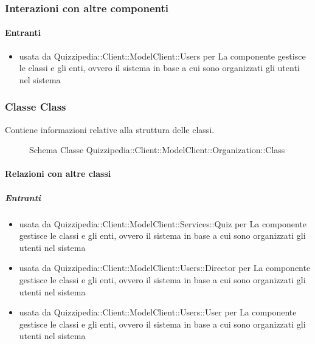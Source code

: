 \subsubsection{Interazioni con altre componenti}
\paragraph{Entranti}
\begin{itemize}
\item usata da Quizzipedia::Client::ModelClient::Users per La componente gestisce le classi e gli enti, ovvero il sistema in base a cui sono organizzati gli utenti nel sistema
\end{itemize}
\subsubsection{Classe Class}
Contiene informazioni relative alla struttura delle classi.
\begin{figure}[H]
\centering
\noindent{}
\caption[Schema Classe Class]{Schema Classe Quizzipedia::Client::ModelClient::Organization::Class}
\end{figure}
\paragraph{Relazioni con altre classi}
\subparagraph{Entranti}
\begin{itemize}
\item usata da Quizzipedia::Client::ModelClient::Services::Quiz per La componente gestisce le classi e gli enti, ovvero il sistema in base a cui sono organizzati gli utenti nel sistema
\item usata da Quizzipedia::Client::ModelClient::Users::Director per La componente gestisce le classi e gli enti, ovvero il sistema in base a cui sono organizzati gli utenti nel sistema
\item usata da Quizzipedia::Client::ModelClient::Users::User per La componente gestisce le classi e gli enti, ovvero il sistema in base a cui sono organizzati gli utenti nel sistema
\end{itemize}
